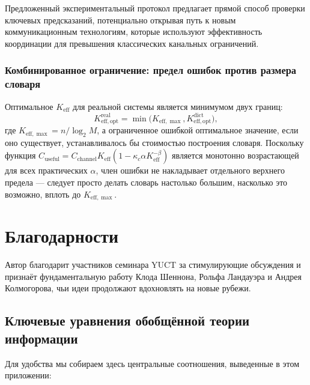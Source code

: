 \documentclass[12pt,a4paper]{article}
\theoremstyle{remark}
\newcommand{\Keff}{K_{\mathrm{eff}}}
\newcommand{\Keffopt}{K_{\mathrm{eff},\mathrm{opt}}}
\newcommand{\Keffmax}{K_{\mathrm{eff},\max}}
\begin{document}
	Предложенный экспериментальный протокол предлагает прямой способ проверки ключевых предсказаний, потенциально открывая путь к новым коммуникационным технологиям, которые используют эффективность координации для превышения классических канальных ограничений.
	
	\subsubsection{Комбинированное ограничение: предел ошибок против размера словаря}
	Оптимальное $\Keff$ для реальной системы является минимумом двух границ:
	\[
	\Keffopt^{\text{real}} = \min\bigl( \Keffmax, \Keffopt^{\text{dict}} \bigr),
	\]
	где $\Keffmax = n / \log_2 M$, а ограниченное ошибкой оптимальное значение, если оно существует, устанавливалось бы стоимостью построения словаря. Поскольку функция $C_{\text{useful}} = C_{\text{channel}} \Keff (1 - \kappa_c\alpha K_{\mathrm{eff}}^{-\beta})$ является монотонно возрастающей для всех практических $\alpha$, член ошибки не накладывает отдельного верхнего предела — следует просто делать словарь настолько большим, насколько это возможно, вплоть до $\Keffmax$.
	
	\section*{Благодарности}
	
	Автор благодарит участников семинара YUCT за стимулирующие обсуждения и признаёт фундаментальную работу Клода Шеннона, Рольфа Ландауэра и Андрея Колмогорова, чьи идеи продолжают вдохновлять на новые рубежи.
	
	\subsection*{Ключевые уравнения обобщённой теории информации}
	Для удобства мы собираем здесь центральные соотношения, выведенные в этом приложении:
	
\end{document}
